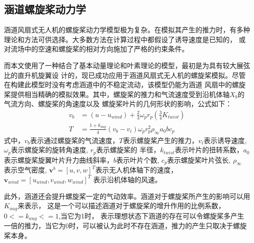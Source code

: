 \subsection{涵道螺旋桨动力学}
涵道风扇式无人机的螺旋桨动力学模型极为复杂。在模拟其产生的推力时，有多种理论和方法可供选择。大多数方法在计算过程中都假设了诱导速度是已知的，
或对流场中的空速和螺旋桨的相对方向施加了严格的约束条件。

而本文使用了一种结合了基本动量理论和叶素理论的模型，最初是为具有较大展弦比的直升机旋翼设
计的，现已成功应用于涵道风扇式无人机的螺旋桨模拟。尽管在构建此模型时没有考虑涵道中的不稳定流动，该模型仍能为涵道
风扇中的螺旋桨提供相当精确的模拟效果\cite{johnson2006modeling}。其中，螺旋桨的推力和气流速度受到沿机体轴$X_{b}$的气流方向、螺旋桨的角速度以及
螺旋桨叶片的几何形状的影响，公式如下\cite{choi2012static}：
\begin{align}
    v_{b} &= \left ( u-u_{wind} \right )  + \frac{2}{3}\omega_{p}r_{p}\left ( \frac{3}{4}K_{twist}\right )\\
    T &= \frac{1+k_{aug}}{4} \left ( v_{b}-v_{i}  \right )\omega _{p}r_{p}^{2}\rho _{\infty}a_{0}bc_{p}   
\end{align}
式中，$v_{b}$表示通过螺旋桨的气流速度，$T$表示螺旋桨产生的推力，$v_{i}$表示诱导速度, $\omega_{p}$表示螺旋桨的旋转角速度, $r_{p}$表示螺旋桨的
半径，$k_{twist}$表示叶片的扭转系数，$a_{0}$表示螺旋桨旋翼叶片升力曲线斜率，$b$表示叶片个数, $c_{p}$表示螺旋桨叶片弦长, $\rho _{\infty}$
表示空气密度, $\mathbf{v}^{b}=\left [ u,v,w \right ]^{T}$表示无人机体轴下的速度，$\mathbf{v}_{wind}=\left [ u_{wind},v_{wind},w_{wind} \right ]^{T}$
表示沿机体轴的风速。

此外，涵道还会提升螺旋桨一定的气动效率\cite{myers2009aerodynamic}。涵道对于螺旋桨所产生的影响可以用$K_{aug}$来表示，
这是一个可以描述涵道对于螺旋桨的增升作用\cite{杜思亮2016轴流状态下涵道螺旋桨增升方法的数值模拟}的比例系数，$0<= k_{aug}<= 1$,当它为1时，
表示理想状态下涵道的存在可以令螺旋桨多产生一倍的推力，当它为0时，可以被认为此时不存在涵道，推力的产生只取决于螺旋桨本身。

